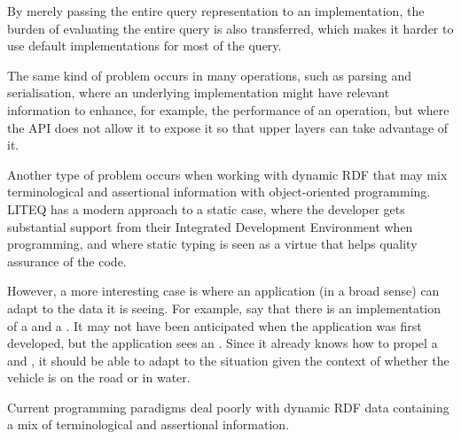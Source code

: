 \begin{problem}\label{prob:dontjustpass}
By merely passing the entire query representation to an
implementation, the burden of evaluating the entire query is also
transferred, which makes it harder to use default implementations for
most of the query.
\end{problem}

The same kind of problem occurs in many operations, such as parsing
and serialisation, where an underlying implementation might have
relevant information to enhance, for example, the performance of an operation,
but where the API does not allow it to expose it so that upper layers
can take advantage of it.

Another type of problem occurs when working with dynamic RDF that may
mix terminological and assertional information with object-oriented
programming. LITEQ \cite{leinberger2014semantic} has a modern approach
to a static case, where the developer gets substantial support from
their Integrated Development Environment when programming, and where
static typing is seen as a virtue that helps quality assurance of the
code.

However, a more interesting case is where an application (in a broad
sense) can adapt to the data it is seeing. For example, say that there
is an implementation of a  and a . It may
not have been anticipated when the application was first developed,
but the application sees an . Since it
already knows how to propel a  and , it
should be able to adapt to the situation given the context of whether
the vehicle is on the road or in water.

\begin{problem}\label{prob:dynaprog}
Current programming paradigms deal poorly with dynamic RDF data
containing a mix of terminological and assertional information.
\end{problem}



